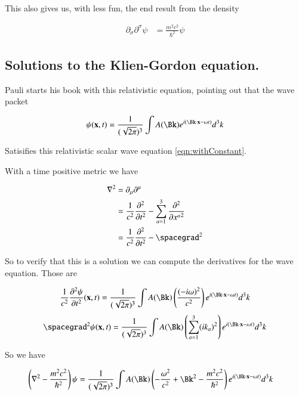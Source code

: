 \documentclass{article}
\newcommand{\PDSq}[2]{\frac{\partial^2 {#2}}{\partial {#1}^2}}
\begin{document}
This also gives us, with less fun, the end result from the density

\begin{align*}
\partial_\sigma \partial^\sigma \psi &= \frac{m^2 c^2}{\hbar^2}\psi 
\end{align*}

\subsection{ Solutions to the Klien-Gordon equation. }

Pauli starts his book \cite{pauli2000wm} with this relativistic equation, pointing out that the wave packet

\begin{align}
\psi(\Bx,t) = \inv{(\sqrt{2\pi})^3}\int A(\Bk) e^{ i (\Bk \cdot \Bx - \omega t)} d^3 k
\end{align}

Satisifies this relativistic scalar wave equation \ref{eqn:withConstant}.

With a time positive metric
we have

\begin{align*}
\grad^2 
&= \partial_\mu\partial^\mu \\
&= \inv{c^2} \PDSq{t}{} - \sum_{a=1}^3 \PDSq{x^a}{} \\
&= \inv{c^2} \PDSq{t}{} - \spacegrad^2
\end{align*}

So to verify that this is a solution we can compute the derivatives for the wave equation.  Those are

\begin{align*}
\inv{c^2} \PDSq{t} \psi(\Bx,t) = \inv{(\sqrt{2\pi})^3}\int A(\Bk) \left( \frac{(-i\omega)^2}{c^2} \right) e^{ i (\Bk \cdot \Bx - \omega t)} d^3 k
\end{align*}
\begin{align*}
\spacegrad^2 \psi(\Bx,t) = \inv{(\sqrt{2\pi})^3}\int A(\Bk) \left(\sum_{a=1}^3 (i k_a)^2 \right)e^{ i (\Bk \cdot \Bx - \omega t)} d^3 k
\end{align*}

So we have

\begin{align*}
\left( \grad^2 - \frac{m^2 c^2}{\hbar^2} \right) \psi 
&=
\inv{(\sqrt{2\pi})^3}\int A(\Bk) \left( -\frac{\omega^2}{c^2} + \Bk^2 - \frac{m^2 c^2}{\hbar^2}
\right)e^{ i (\Bk \cdot \Bx - \omega t)} d^3 k
\end{align*}
\end{document}
